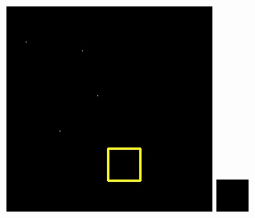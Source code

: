 \documentclass[UTF8]{ctexart}
\begin{document}
\begin{figure}[H]
{\begin{minipage}[b]{0.15\linewidth}
            \includegraphics[width=1\linewidth]{../log/cut/LC80650182013237LGN00_10854_my.jpg}\vspace{4pt}
            \includegraphics[width=1\linewidth]{../log/cut/tmp_cut_LC80650182013237LGN00_10854_my.jpg}

\end{minipage}}
\end{figure}
\end{document}
